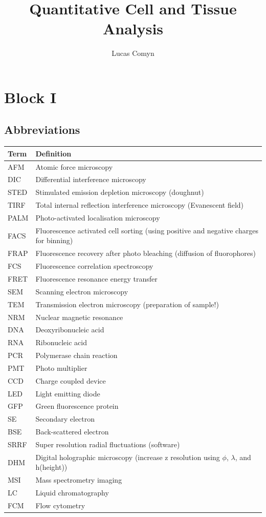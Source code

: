 \documentclass{article}
\title{Quantitative Cell and Tissue Analysis}
\author{Lucas Comyn}
\begin{document}
\maketitle


\section{Block I}
 \subsection{Abbreviations}
\begin{table}[H]
\centering
\begin{tabular}{|l|l|}
\hline
\textbf{Term} & \textbf{Definition} \\ \hline
AFM & Atomic force microscopy \\ \hline
DIC & Differential interference microscopy \\ \hline
STED & Stimulated emission depletion microscopy (doughnut) \\ \hline
TIRF & Total internal reflection interference microscopy (Evanescent field)\\ \hline
PALM & Photo-activated localisation microscopy \\ \hline
FACS & Fluorescence activated cell sorting (using positive and negative charges for binning) \\ \hline
FRAP & Fluorescence recovery after photo bleaching (diffusion of fluorophores) \\ \hline
FCS & Fluorescence correlation spectroscopy \\ \hline
FRET & Fluorescence resonance energy transfer \\ \hline
SEM & Scanning electron microscopy \\ \hline
TEM & Transmission electron microscopy (preparation of sample!) \\ \hline
NRM & Nuclear magnetic resonance \\ \hline
DNA & Deoxyribonucleic acid \\ \hline
RNA & Ribonucleic acid \\ \hline
PCR & Polymerase chain reaction \\ \hline
PMT & Photo multiplier \\ \hline
CCD & Charge coupled device \\ \hline
LED & Light emitting diode \\ \hline
GFP & Green fluorescence protein \\ \hline
SE & Secondary electron \\ \hline
BSE & Back-scattered electron \\ \hline
SRRF & Super resolution radial fluctuations (software) \\ \hline
DHM & Digital holographic microscopy (increase z resolution using $\phi$, $\lambda$, and h(height)) \\ \hline
MSI & Mass spectrometry imaging \\ \hline
LC & Liquid chromatography \\ \hline
FCM & Flow cytometry \\ \hline


\end{tabular}
\end{table}
\end{document}
